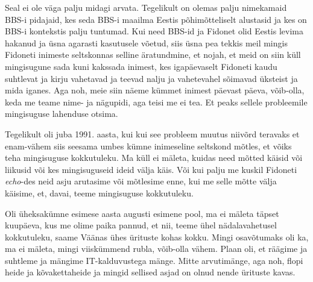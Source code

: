 
Seal ei ole väga palju midagi arvata. Tegelikult on olemas palju nimekamaid 
BBS-i pidajaid, kes seda  BBS-i maailma Eestis põhimõtteliselt  alustasid ja 
kes on BBS-i kontekstis palju tuntumad. Kui need BBS-id ja Fidonet  olid Eestis 
levima hakanud ja üsna agarasti kasutusele võetud, siis üsna pea tekkis meil 
mingis Fidoneti inimeste seltskonnas  selline äratundmine, et nojah, et meid on 
siin küll mingisugune sada kuni kakssada inimest, kes igapäevaselt   Fidoneti 
kaudu suhtlevat ja kirju vahetavad ja teevad nalju ja vahetevahel sõimavad 
üksteist ja mida iganes. Aga noh, meie siin  näeme kümmet inimest päevast 
päeva, võib-olla, keda me teame nime- ja nägupidi, aga teisi me ei tea. Et 
peaks sellele probleemile mingisuguse lahenduse otsima. 

Tegelikult oli juba 1991. aasta, kui kui see probleem muutus niivõrd teravaks 
et enam-vähem siis seesama  umbes kümne inimeseline seltskond mõtles, et võiks 
teha mingisuguse kokkutuleku. Ma küll ei mäleta, kuidas need mõtted käisid või 
liikusid või kes mingisuguseid ideid välja käis. Või kui palju me kuskil 
Fidoneti \emph{echo}-des neid asju arutasime või mõtlesime enne, kui me selle 
mõtte välja käisime, et, davai, teeme mingisuguse kokkutuleku.

Oli üheksakümne esimese aasta augusti esimene pool, ma ei mäleta täpset 
kuupäeva, kus me olime  paika pannud, et nii, teeme  ühel nädalavahetusel 
kokkutuleku, saame Väänas ühes ürituste kohas kokku. Mingi osavõtumaks oli ka,  
ma ei mäleta, mingi viiskümmend rubla,  võib-olla vähem. Plaan oli, et räägime  ja suhtleme ja mängime   
IT-kalduvustega mänge. Mitte arvutimänge, aga noh, flopi heide ja 
kõvakettaheide ja mingid sellised asjad on olnud nende ürituste kavas. 


